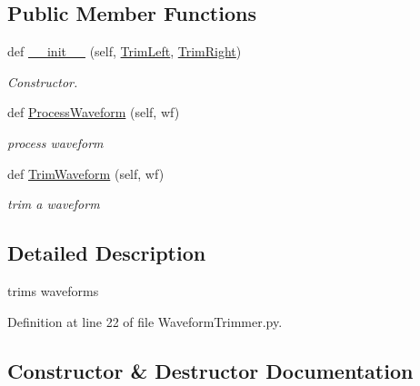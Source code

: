 \subsection*{Public Member Functions}
\begin{DoxyCompactItemize}
\item 
def \hyperlink{classSignalIntegrity_1_1TimeDomain_1_1Filters_1_1WaveformTrimmer_1_1WaveformTrimmer_a4bd17ae845afc3d863e564ff483b9d64}{\+\_\+\+\_\+init\+\_\+\+\_\+} (self, \hyperlink{classSignalIntegrity_1_1TimeDomain_1_1Filters_1_1FilterDescriptor_1_1FilterDescriptor_aa755b1fade9a131f66c5a448181a158e}{Trim\+Left}, \hyperlink{classSignalIntegrity_1_1TimeDomain_1_1Filters_1_1FilterDescriptor_1_1FilterDescriptor_a284517d97da4a4e39890e41cbfa2a007}{Trim\+Right})
\begin{DoxyCompactList}\small\item\em Constructor. \end{DoxyCompactList}\item 
def \hyperlink{classSignalIntegrity_1_1TimeDomain_1_1Filters_1_1WaveformTrimmer_1_1WaveformTrimmer_ae09bec195c9cb1d5819e73b7be169b11}{Process\+Waveform} (self, wf)
\begin{DoxyCompactList}\small\item\em process waveform \end{DoxyCompactList}\item 
def \hyperlink{classSignalIntegrity_1_1TimeDomain_1_1Filters_1_1WaveformTrimmer_1_1WaveformTrimmer_aba4602fa45a1eaabd2eb64f1866def53}{Trim\+Waveform} (self, wf)
\begin{DoxyCompactList}\small\item\em trim a waveform \end{DoxyCompactList}\end{DoxyCompactItemize}


\subsection{Detailed Description}
trims waveforms 

Definition at line 22 of file Waveform\+Trimmer.\+py.



\subsection{Constructor \& Destructor Documentation}
\mbox{\label{classSignalIntegrity_1_1TimeDomain_1_1Filters_1_1WaveformTrimmer_1_1WaveformTrimmer_a4bd17ae845afc3d863e564ff483b9d64}} 
